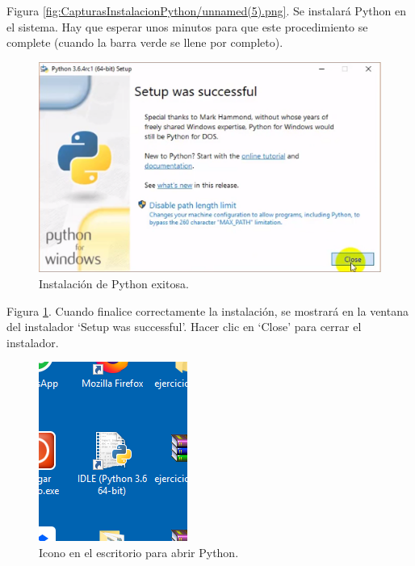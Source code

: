 Figura \ref{fig:CapturasInstalacionPython/unnamed(5).png}. Se instalará Python en el sistema. Hay que esperar unos minutos para que este procedimiento se complete (cuando la barra verde se llene por completo).\\[20pt]

\begin{figure}[h!]
  	\centering
	\includegraphics[width=\textwidth]{CapturasInstalacionPython/unnamed(6).png}
	\caption{Instalación de Python exitosa.
	\label{fig:CapturasInstalacionPython/unnamed(6).png}}
\end{figure}

Figura \ref{fig:CapturasInstalacionPython/unnamed(6).png}. Cuando finalice correctamente la instalación, se mostrará en la ventana del instalador ‘Setup was successful’. Hacer clic en ‘Close’ para cerrar el instalador.\\[20pt]

\begin{figure}[h!]
  	\centering
	\includegraphics[scale=1]{CapturasInstalacionPython/unnamed(7).png}
	\caption{Icono en el escritorio para abrir Python.
	\label{fig:CapturasInstalacionPython/unnamed(7).png}}
\end{figure}

